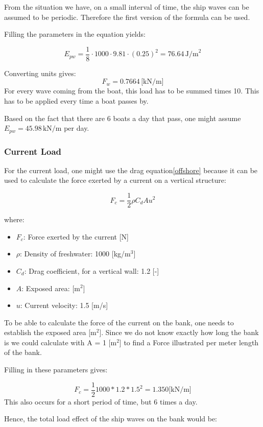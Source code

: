From the situation we have, on a small interval of time, the ship waves can be assumed to be periodic. Therefore the first version of the formula can be used. 

Filling the parameters in the equation yields: 

$$
E_{pw} = \frac{1}{8} \cdot 1000 \cdot 9.81 \cdot (0.25)^2 = 76.64 \, \text{J/m}^2
$$

Converting units gives:
$$
{F_w}= 0.7664 \, \text{[kN/m]}
$$
For every wave coming from the boat, this load has to be summed times 10. This has to be applied every time a boat passes by.

Based on the fact that there are 6 boats a day that pass, one might assume $ E_{pw} = 45.98  \, \text{kN/m}$ per day. 

\subsubsection{Current Load}
For the current load, one might use the drag equation\ref{offshore}
because it can be used to calculate the force exerted by a current on a vertical structure:

$$
F_c = \frac{1}{2} \rho C_d A u^2
$$

\noindent where:
\begin{itemize}
    \item \textbf{$ F_c $}: Force exerted by the current [N]
    \item \textbf{$ \rho $}: Density of freshwater: 1000 [kg/m$^3$]
    \item \textbf{$ C_d $}: Drag coefficient, for a vertical wall: 1.2 [-]
    \item \textbf{$ A $}: Exposed area:  [m$^2$]
    \item \textbf{$ u $}: Current velocity: 1.5 [m/s]
\end{itemize}

To be able to calculate the force of the current on the bank, one needs to establish the exposed area [m$^2$]. Since we do not know exactly how long the bank is we could calculate with A = 1 [m$^2$] to find a Force illustrated per meter length of the bank.

Filling in these parameters gives:

$$
F_c = \frac{1}{2} 1000*1.2* 1.5^2 = 1.350 \text{[kN/m]}
$$
This also occurs for a short period of time, but 6 times a day.

Hence, the total load effect of the ship waves on the bank would be:

